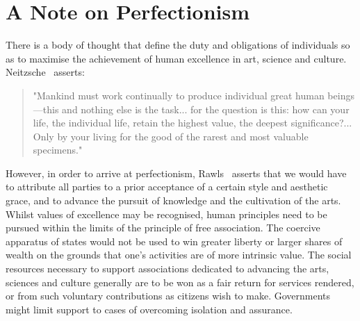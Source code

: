 \documentclass[11pt, oneside]{book}   	%
\begin{document}
\section{A Note on Perfectionism}

There is a body of thought that define the duty and obligations of individuals so as to maximise the achievement of human excellence in art, science and culture. Neitzsche~\cite{gam1} asserts:

\begin{quote}
"Mankind must work continually to produce individual great human beings---this and nothing else is the task... for the question is this: how can your life, the individual life, retain the highest value, the deepest significance?... Only by your living for the good of the rarest and most valuable specimens."
\end{quote}
However, in order to arrive at perfectionism, Rawls~\cite{jr1} asserts that we would have to attribute all parties to a prior acceptance of a certain style and aesthetic grace, and to advance the pursuit of knowledge and the cultivation of the arts.
Whilst values of excellence may be recognised, human principles need to be pursued within the limits of the principle of free association.
The coercive apparatus of states would not be used to win greater liberty or larger shares of wealth on the grounds that one's activities are of more intrinsic value.
The social resources necessary to support associations dedicated to advancing the arts, sciences and culture generally are to be won as a fair return for services rendered, or from such voluntary contributions as citizens wish to make.
Governments might limit support to cases of overcoming isolation and assurance.
\end{document}
